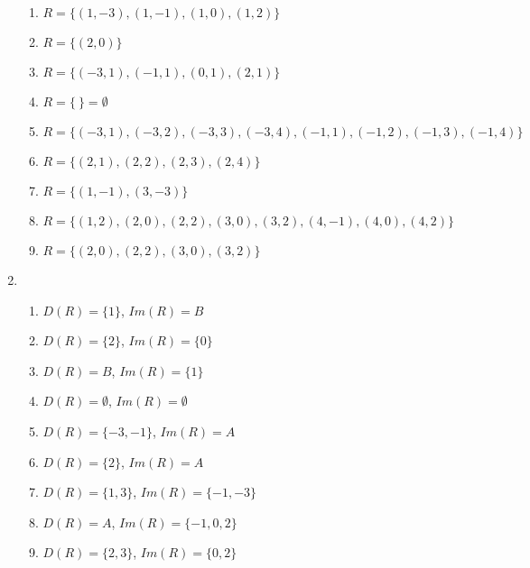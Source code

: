 \documentclass[a4paper]{article}
\begin{document}
\begin{enumerate}
  \begin{enumerate}
  \item $R=\{(1,-3), (1,-1), (1,0), (1,2)\}$ %
  \item $R=\{(2,0)\}$ %
  \item $R=\{(-3,1), (-1,1), (0,1), (2,1)\}$ %
  \item $R=\{\ \}=\emptyset$ %
  \item $R=\{(-3,1), (-3,2), (-3,3), (-3,4), (-1,1), (-1,2), (-1,3), (-1,4)\}$ %
  \item $R=\{(2,1), (2,2), (2,3), (2,4)\}$ %
  \item $R=\{(1,-1), (3,-3)\}$ %
  \item $R=\{(1,2), (2,0), (2,2), (3,0), (3,2), (4,-1), (4,0),
    (4,2)\}$ %
  \item $R=\{(2,0), (2,2), (3,0), (3,2)\}$ %
  \end{enumerate}

\item \ %

  \begin{enumerate}
  \item $D(R) = \{1\}$, $Im(R)=B$
  \item $D(R) = \{2\}$, $Im(R)=\{0\}$
  \item $D(R) = B$, $Im(R)=\{1\}$
  \item $D(R) = \emptyset$, $Im(R)=\emptyset$
  \item $D(R) = \{-3,-1\}$, $Im(R)=A$
  \item $D(R) = \{2\}$, $Im(R)=A$
  \item $D(R) = \{1,3\}$, $Im(R)=\{-1,-3\}$
  \item $D(R) = A$, $Im(R)=\{-1,0,2\}$
  \item $D(R) = \{2,3\}$, $Im(R)=\{0,2\}$
  \end{enumerate}

\newpage


\end{enumerate}
\end{document}
